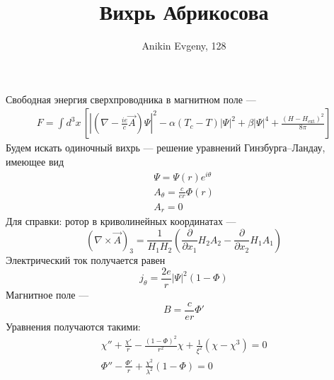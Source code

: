\documentclass{article}
\title{Вихрь Абрикосова}
\author{Anikin Evgeny, 128}
\begin{document}
\maketitle
Свободная энергия сверхпроводника в магнитном поле ---
\begin{multline}
    F = \int d^3x\,\left[\left|\left(\nabla  - \frac{ie}{c} \vec{A}\right)\Psi\right|^2 - 
                \alpha (T_c - T) |\Psi|^2 + \beta |\Psi|^4  +
                \frac{(H - H_{\mathrm{ext}})^2}{8\pi}\right]
\end{multline}
Будем искать одиночный вихрь --- решение уравнений Гинзбурга--Ландау, имеющее вид
\begin{equation}
    \begin{gathered}
        \Psi = \Psi(r)e^{i\theta}\\
        A_\theta = \frac{c}{er} \Phi(r)\\
        A_r = 0
    \end{gathered}
\end{equation}
Для справки: ротор в криволинейных координатах ---
\begin{equation}
    (\nabla \times \vec{A})_3 = \frac{1}{H_1 H_2}
         \left (\frac{\partial}{\partial x_1} H_2 A_2 - 
                \frac{\partial}{\partial x_2} H_1 A_1 \right)
\end{equation}
Электрический ток получается равен
\begin{equation}
    j_\theta = \frac{2e}{r} |\Psi|^2 (1 - \Phi)
\end{equation}
Магнитное поле --- 
\begin{equation}
    B = \frac{c}{er} \Phi'
\end{equation}
Уравнения получаются такими:
\begin{equation}
    \begin{gathered}
        \chi'' + \frac{\chi'}{r} - \frac{(1 - \Phi)^2}{r^2} \chi + 
            \frac{1}{\xi^2} (\chi - \chi^3) = 0\\
        \Phi'' - \frac{\Phi'}{r} + \frac{\chi^2}{\lambda^2}(1 - \Phi) = 0
    \end{gathered}
\end{equation}
\end{document}
